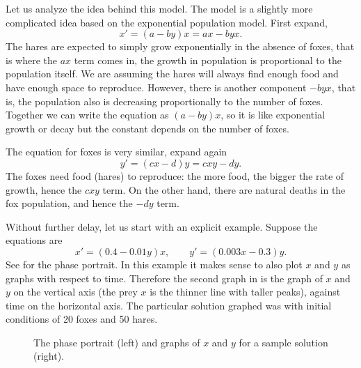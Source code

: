 \documentclass[12pt]{book}
\begin{document}
Let us analyze the idea behind this model.  The model is a slightly more
complicated idea based on the exponential population model.
First expand,
\begin{equation*}
x' = (a-by)x = ax - byx .
\end{equation*}
The hares are expected to simply grow exponentially in the absence of foxes,
that is where the $ax$ term comes in, the growth in population is
proportional to the population itself.  We are assuming the hares
will always find enough food and have enough space to reproduce.  However,
there is another component $-byx$, that is, the population also is
decreasing proportionally to the number of foxes.  Together we can write the
equation as $(a-by)x$, so it is like exponential growth or decay but the
constant depends on the number of foxes.

The equation for foxes is very similar, expand again
\begin{equation*}
y' = (cx-d)y = cxy-dy .
\end{equation*}
The foxes need food (hares) to reproduce: the more food, the bigger the
rate of growth, hence the $cxy$ term.  On the other hand, there are 
natural deaths in the fox population, and hence the $-dy$ term.

Without further delay, let us start with an explicit example.  Suppose the
equations are 
\begin{equation*}
x' = (0.4-0.01y)x, \qquad y' = (0.003x-0.3)y .
\end{equation*}
See  for the phase portrait.  In this example
it makes sense to also plot $x$ and $y$ as graphs with respect to time.
Therefore the second graph in 
 is the graph of $x$ and $y$ on the vertical
axis (the prey $x$ is the thinner line with taller peaks), against time
on the horizontal axis.  The particular solution graphed was with initial
conditions of 20 foxes and 50 hares.
\begin{figure}[h!t]
\capstart
\begin{center}
\caption{The phase portrait (left) and graphs of $x$ and $y$ for
a sample solution (right). \label{fig:nlin-pred-prey}}
\end{center}
\end{figure}
\end{document}
